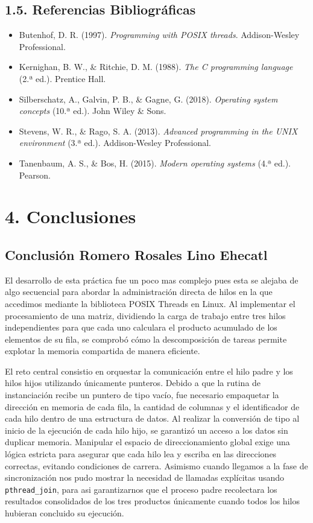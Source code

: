 \documentclass{article}
\begin{document}
\subsection*{1.5. Referencias Bibliográficas}
\begin{itemize}
    \item Butenhof, D. R. (1997). \textit{Programming with POSIX threads}. Addison-Wesley Professional.
    \item Kernighan, B. W., \& Ritchie, D. M. (1988). \textit{The C programming language} (2.ª ed.). Prentice Hall.
    \item Silberschatz, A., Galvin, P. B., \& Gagne, G. (2018). \textit{Operating system concepts} (10.ª ed.). John Wiley \& Sons.
    \item Stevens, W. R., \& Rago, S. A. (2013). \textit{Advanced programming in the UNIX environment} (3.ª ed.). Addison-Wesley Professional.
    \item Tanenbaum, A. S., \& Bos, H. (2015). \textit{Modern operating systems} (4.ª ed.). Pearson.
\end{itemize}


\section*{4. Conclusiones}

\subsection*{Conclusión Romero Rosales Lino Ehecatl}

El desarrollo de esta práctica fue un poco mas complejo pues esta se alejaba de algo secuencial para abordar la administración directa de hilos en la que accedimos mediante la biblioteca POSIX Threads en Linux. Al implementar el procesamiento de una matriz, dividiendo la carga de trabajo entre tres hilos independientes para que cada uno calculara el producto acumulado de los elementos de su fila, se comprobó cómo la descomposición de tareas permite explotar la memoria compartida de manera eficiente.

El reto central consistio en orquestar la comunicación entre el hilo padre y los hilos hijos utilizando únicamente punteros. Debido a que la rutina de instanciación recibe un puntero de tipo vacío, fue necesario empaquetar la dirección en memoria de cada fila, la cantidad de columnas y el identificador de cada hilo dentro de una estructura de datos. Al realizar la conversión de tipo al inicio de la ejecución de cada hilo hijo, se garantizó un acceso a los datos sin duplicar memoria. Manipular el espacio de direccionamiento global exige una lógica estricta para asegurar que cada hilo lea y escriba en las direcciones correctas, evitando condiciones de carrera. Asimismo cuando llegamos a la fase de sincronización nos pudo mostrar la necesidad de llamadas explícitas usando \texttt{pthread\_join}, para asi garantizarnos que el proceso padre recolectara los resultados consolidados de los tres productos únicamente cuando todos los hilos hubieran concluido su ejecución.
\end{document}
